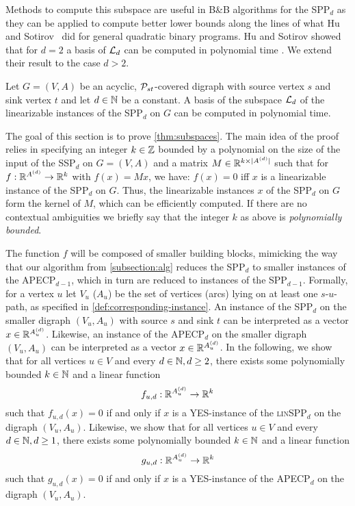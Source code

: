 Methods to compute this subspace 
are useful in
B\&B algorithms 
for the SPP$_d$ as they can be applied to compute
better lower bounds along the lines of what Hu and Sotirov~\cite{huSo2021} did for general quadratic binary programs.
Hu and Sotirov showed that for $d = 2$ a basis of ${\cal L}_d$ can be computed in polynomial time \cite[Prop. 5]{huSo2021}.
We extend their result 
to the case  $d > 2$.
\begin{theorem}
\label{thm:subspaces}
Let $G = (V, A)$ be  an acyclic, $\mathcal{P}_{st}$-covered digraph with source vertex $s$ and sink vertex $t$ and let   $d \in \mathbb{N}$ be a constant.  A basis of the subspace ${\cal L}_d$  of the  linearizable instances of the SPP$_d$ on $G$  can be computed in polynomial time.  
\end{theorem}
%
The goal of this section is to prove \cref{thm:subspaces}.  The main idea of the proof relies in specifying   an integer  $k\in \mathbb{Z}$  bounded by  a polynomial  on the size of the input of the SSP$_d$ on $G=(V,A)$ and  a  matrix $M\in \mathbb{R}^{k\times |A^{(d)}|}$ 
such that for  $f: \mathbb{R}^{A^{(d)}} \rightarrow \mathbb{R}^k$ with  $f(x)=Mx$,  we have:
$f(x) = 0$ 
iff
$x$ is  a linearizable instance of the SPP$_d$ on $G$. Thus,  the linearizable instances $x$ of the SPP$_d$ on $G$
form the kernel of $M$, which can be efficiently computed.
If there are no contextual ambiguities we briefly say that the integer $k$ as above is \emph{polynomially bounded}.

The function $f$ will be composed of smaller building blocks, mimicking the way that our algorithm from \cref{subsection:alg} reduces the SPP$_d$ to smaller instances of the APECP$_{d-1}$, which in turn are reduced to instances of the SPP$_{d-1}$. Formally, for a vertex $u$ let $V_u$ ($A_u$) be the set of vertices (arcs)  lying on at least one $s$-$u$-path, as specified in \cref{def:corresponding-instance}. An instance of the SPP$_{d}$ on the smaller digraph $(V_u, A_u)$ with source $s$ and sink $t$ can be interpreted as a vector $x \in \mathbb{R}^{A_u^{(d)}}$. Likewise, an instance of the APECP$_{d}$ on the smaller digraph $(V_u, A_u)$ can be interpreted as a vector $x \in \mathbb{R}^{A_u^{(d)}}$. 
In the following, we show that for all vertices $u \in V$ and every $d \in \mathbb{N}, d\geq 2$, there exists some polynomially bounded $k \in \mathbb{N}$ and a linear function
\[
f_{u,d} : \mathbb{R}^{A_u^{(d)}} \rightarrow \mathbb{R}^k
\]
such that $f_{u,d}(x) = 0$ if and only if $x$ is a YES-instance of the \textsc{lin}SPP$_d$ on the digraph $(V_u, A_u)$. Likewise, we show that for all vertices $u \in V$ and every $d \in \mathbb{N}, d\geq 1$, there exists some polynomially bounded $k \in \mathbb{N}$ and a linear function
\[
g_{u,d} : \mathbb{R}^{A_u^{(d)}} \rightarrow \mathbb{R}^k
\]
such that $g_{u,d}(x) = 0$ if and only if $x$ is a YES-instance of the APECP$_{d}$ on the digraph $(V_u, A_u)$. 

